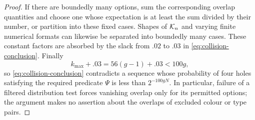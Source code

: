 \begin{proof}
If there are boundedly many options, sum the corresponding
overlap quantities and choose one whose expectation is at
least the sum divided by their number, or partition into
these fixed cases.  Shapes of $\mathcal K_n$ and varying finite
numerical formats can likewise be separated into boundedly
many cases.  These constant factors are absorbed by the
slack from $.02$ to $.03$ in
\eqref{eq:collision-conclusion}.  Finally
\[
 k_{\max}+.03=56(g-1)+.03<100g,
\]
so \eqref{eq:collision-conclusion} contradicts a sequence
whose probability of four holes satisfying the required
predicate $\Psi$ is less than $2^{-100gN}$.  In particular,
failure of a filtered distribution test forces vanishing
overlap only for its permitted options; the argument makes
no assertion about the overlaps of excluded colour or type
pairs.
\end{proof}

